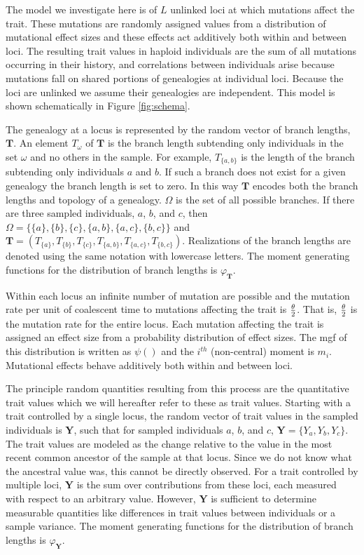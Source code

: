 The model we investigate here is of $L$ unlinked loci at which mutations affect
the trait. These mutations are randomly assigned values from a distribution of
mutational effect sizes and these effects act additively both within and between
loci. The resulting trait values in haploid individuals are the sum of all
mutations occurring in their history, and correlations between individuals arise
because mutations fall on shared portions of genealogies at individual loci.
Because the loci are unlinked we assume their genealogies are independent. This
model is shown schematically in Figure \ref{fig:schema}.

The genealogy at a locus is represented by the random vector of branch lengths,
$\mathbf{T}$. An element $T_{\omega}$ of $\mathbf{T}$ is the branch length
subtending only individuals in the set $\omega$ and no others in the sample. For
example, $T_{\{a,b\}}$ is the length of the branch subtending only individuals
$a$ and $b$. If such a branch does not exist for a given genealogy the branch
length is set to zero. In this way $\mathbf{T}$ encodes both the branch lengths
and topology of a genealogy. $\Omega$ is the set of all possible branches. If
there are three sampled individuals, $a$, $b$, and $c$, then
$\Omega=\{\{a\},\{b\},\{c\},\{a,b\},\{a,c\},\{b,c\}\}$ and
$\mathbf{T}=(T_{\{a\}},T_{\{b\}},T_{\{c\}},T_{\{a,b\}},T_{\{a,c\}},T_{\{b,c\}})$.
Realizations of the branch lengths are denoted using the same notation with
lowercase letters. The moment generating functions for the distribution of
branch lengths is $\varphi_{\mathbf{T}}$. 

Within each locus an infinite number of mutation are possible and the mutation
rate per unit of coalescent time to mutations affecting the trait is $\frac{\theta}{2}$. That
is, $\frac{\theta}{2}$ is the mutation rate for the entire locus. Each mutation affecting the
trait is assigned an effect size from a probability distribution of effect
sizes. The mgf of this distribution is written as $\psi()$ and the $i^{th}$
(non-central) moment is $m_i$. Mutational effects behave additively both within
and between loci.

The principle random quantities resulting from this process are the quantitative
trait values which we will hereafter refer to these as trait values. Starting
with a trait controlled by a single locus, the random vector of trait values in
the sampled individuals is $\mathbf{Y}$, such that for sampled individuals $a$,
$b$, and $c$, $\mathbf{Y}=\{Y_a,Y_b,Y_c\}$. The trait values are modeled as the
change relative to the value in the most recent common ancestor of the sample at
that locus. Since we do not know what the ancestral value was, this cannot be
directly observed. For a trait controlled by multiple loci, $\mathbf{Y}$ is the
sum over contributions from these loci, each measured with respect to an
arbitrary value. However, $\mathbf{Y}$ is sufficient to determine measurable
quantities like differences in trait values between individuals or a sample
variance. The moment generating functions for the distribution of branch lengths
is $\varphi_{\mathbf{Y}}$.

